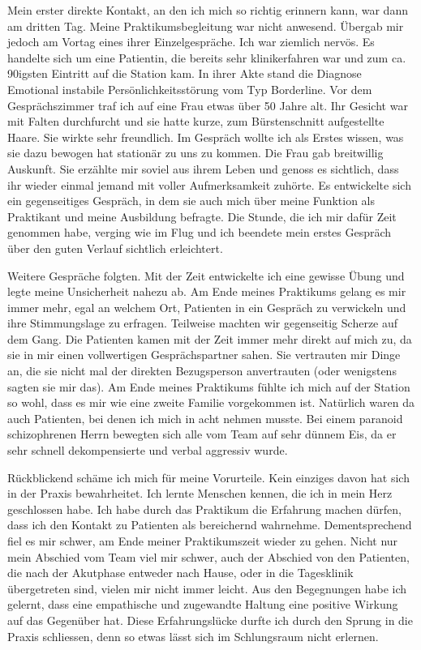 Mein erster direkte Kontakt, an den ich mich so richtig erinnern kann, war dann am dritten Tag. Meine Praktikumsbegleitung war nicht anwesend. Übergab mir jedoch am Vortag eines ihrer Einzelgespräche. Ich war ziemlich nervös. Es handelte sich um eine Patientin, die bereits sehr klinikerfahren war und zum ca. 90igsten Eintritt auf die Station kam. In ihrer Akte stand die Diagnose Emotional instabile Persönlichkeitsstörung vom Typ Borderline. Vor dem Gesprächszimmer traf ich auf eine Frau etwas über 50 Jahre alt. Ihr Gesicht war mit Falten durchfurcht und sie hatte kurze, zum Bürstenschnitt aufgestellte Haare. Sie wirkte sehr freundlich. Im Gespräch wollte ich als Erstes wissen, was sie dazu bewogen hat stationär zu uns zu kommen. Die Frau gab breitwillig Auskunft. Sie erzählte mir soviel aus ihrem Leben und genoss es sichtlich, dass ihr wieder einmal jemand mit voller Aufmerksamkeit zuhörte. Es entwickelte sich ein gegenseitiges Gespräch, in dem sie auch mich über meine Funktion als Praktikant und meine Ausbildung befragte. Die Stunde, die ich mir dafür Zeit genommen habe, verging wie im Flug und ich beendete mein erstes Gespräch über den guten Verlauf sichtlich erleichtert.

Weitere Gespräche folgten. Mit der Zeit entwickelte ich eine gewisse Übung und legte meine Unsicherheit nahezu ab. Am Ende meines Praktikums gelang es mir immer mehr, egal an welchem Ort, Patienten in ein Gespräch zu verwickeln und ihre Stimmungslage zu erfragen. Teilweise machten wir gegenseitig Scherze auf dem Gang. Die Patienten kamen mit der Zeit immer mehr direkt auf mich zu, da sie in mir einen vollwertigen Gesprächspartner sahen. Sie vertrauten mir Dinge an, die sie nicht mal der direkten Bezugsperson anvertrauten (oder wenigstens sagten sie mir das). Am Ende meines Praktikums fühlte ich mich auf der Station so wohl, dass es mir wie eine zweite Familie vorgekommen ist. Natürlich waren da auch Patienten, bei denen ich mich in acht nehmen musste. Bei einem paranoid schizophrenen Herrn bewegten sich alle vom Team auf sehr dünnem Eis, da er sehr schnell dekompensierte und verbal aggressiv wurde.

Rückblickend schäme ich mich für meine Vorurteile. Kein einziges davon hat sich in der Praxis bewahrheitet. Ich lernte Menschen kennen, die ich in mein Herz geschlossen habe. Ich habe durch das Praktikum die Erfahrung machen dürfen, dass ich den Kontakt zu Patienten als bereichernd wahrnehme. Dementsprechend fiel es mir schwer, am Ende meiner Praktikumszeit wieder zu gehen. Nicht nur mein Abschied vom Team viel mir schwer, auch der Abschied von den Patienten, die nach der Akutphase entweder nach Hause, oder in die Tagesklinik übergetreten sind, vielen mir nicht immer leicht. Aus den Begegnungen habe ich gelernt, dass eine empathische und zugewandte Haltung eine positive Wirkung auf das Gegenüber hat. Diese Erfahrungslücke durfte ich durch den Sprung in die Praxis schliessen, denn so etwas lässt sich im Schlungsraum nicht erlernen. 

